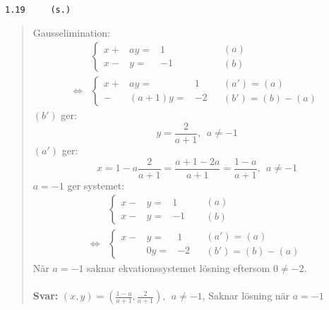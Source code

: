 \documentclass[a4paper]{article}
\newcommand{\tskcol}[1]{\textcolor{tskcol}{#1}}
\begin{document}
\texttt{\tskcol{1.19~~~~ (s.)}}
\begin{quotation}
	\noindent
	Gausselimination:
	\begin{align*}
	&\left\{\begin{array}{rrr}
	x+&ay=&1 \\
	x-& y=&-1
	\end{array}\right.
	&\begin{array}{l}
	(a) \\
	(b)
	\end{array} \\ \Leftrightarrow
	&\left\{\begin{array}{rrr}
	x+&    ay=&1 \\
	 -&(a+1)y=&-2
	\end{array}\right.
	&\begin{array}{l}
	(a')=(a) \\
	(b')=(b)-(a)
	\end{array}
	\end{align*}
	$(b')$ ger:
	\[y=\frac{2}{a+1},~~a\neq-1\]
	$(a')$ ger:
	\[x=1-a\frac{2}{a+1}=\frac{a+1-2a}{a+1}=\frac{1-a}{a+1},~~a\neq-1\]
	$a=-1$ ger systemet:
	\begin{align*}
	&\left\{\begin{array}{rrr}
	x-&y=&1 \\
	x-&y=&-1
	\end{array}\right.
	&\begin{array}{l}
	(a) \\
	(b)
	\end{array} \\ \Leftrightarrow
	&\left\{\begin{array}{rrr}
	x-& y=&1 \\
	  &0y=&-2
	\end{array}\right.
	&\begin{array}{l}
	(a')=(a) \\
	(b')=(b)-(a)
	\end{array}
	\end{align*}
	När $a=-1$ saknar ekvationssystemet lösning eftersom $0\neq-2$.
	\\ \\
	\textbf{Svar:} $(x,y)=(\frac{1-a}{a+1},\frac{2}{a+1}),~~a\neq-1$, Saknar lösning när $a=-1$
\end{quotation}
\end{document}

